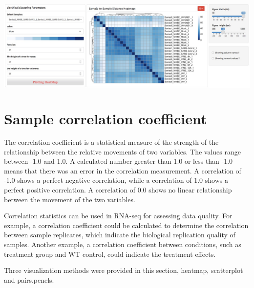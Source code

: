 \documentclass[
  a4paper,
  oneside]{book}
\begin{document}
\includegraphics{images/quality_ssd.jpeg}

\hypertarget{sample-correlation-coefficient}{%
\section{Sample correlation coefficient}\label{sample-correlation-coefficient}}

The correlation coefficient is a statistical measure of the strength of the relationship between the relative movements of two variables. The values range between -1.0 and 1.0. A calculated number greater than 1.0 or less than -1.0 means that there was an error in the correlation measurement. A correlation of -1.0 shows a perfect negative correlation, while a correlation of 1.0 shows a perfect positive correlation. A correlation of 0.0 shows no linear relationship between the movement of the two variables.

Correlation statistics can be used in RNA-seq for assessing data quality. For example, a correlation coefficient could be calculated to determine the correlation between sample replicates, which indicate the biological replication quality of samples. Another example, a correlation coefficient between conditions, such as treatment group and WT control, could indicate the treatment effects.

Three visualization methods were provided in this section, heatmap, scatterplot and pairs.penels.
\end{document}
